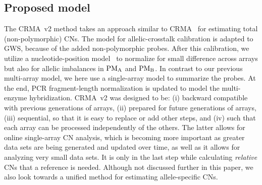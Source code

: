 \documentclass{bioinfo}
\newcommand{\GWS}{GWS\xspace}
\newcommand{\PMA}{\ensuremath{\textnormal{PM}_\textnormal{A}}\xspace}
\newcommand{\PMB}{\ensuremath{\textnormal{PM}_\textnormal{B}}\xspace}
\begin{document}
\subsection{Proposed model}

The CRMA~v2 method takes an approach similar to CRMA~\citep{BengtssonH_etal_2008} for estimating total (non-polymorphic) CNs.  The model for allelic-crosstalk calibration is adapted to \GWS, because of the added non-polymorphic probes.  After this calibration, we utilize a nucleotide-position model~\citep{CarvalhoB_etal_2007} to normalize for small difference across arrays but also for allelic imbalances in \PMA and \PMB.  
In contrast to our previous multi-array model, we here use a single-array model to summarize the probes.  At the end, PCR fragment-length normalization is updated to model the multi-enzyme hybridization.
CRMA~v2 was designed to be:
(i) backward compatible with previous generations of arrays,
(ii) prepared for future generations of arrays, 
(iii) sequential, so that it is easy to replace or add other steps, and
(iv) such that each array can be processed independently of the others.
The latter allows for online single-array CN analysis, which is becoming more important as greater data sets are being generated and updated over time, as well as it allows for analyzing very small data sets.
It is only in the last step while calculating \emph{relative} CNs that a reference is needed.
Although not discussed further in this paper, we also look towards a unified method for estimating allele-specific CNs.
\end{document}
